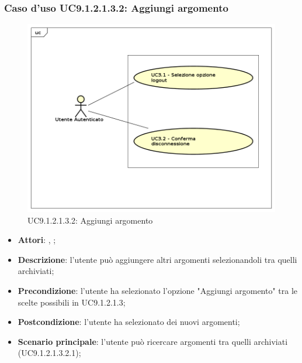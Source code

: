 						\subsubsection{Caso d'uso UC9.1.2.1.3.2: Aggiungi argomento}
						\label{UC9.1.2.1.3.2}
						\begin{figure}[h]
							\centering
							\includegraphics[scale=0.7,keepaspectratio]{UML/UC9.png}
							\caption{UC9.1.2.1.3.2: Aggiungi argomento}
						\end{figure}
						\FloatBarrier
						\begin{itemize}
							\item \textbf{Attori}: \uau, \uaupro;
							\item \textbf{Descrizione}: l'utente può aggiungere altri argomenti selezionandoli tra quelli archiviati;  
							\item \textbf{Precondizione}: l'utente ha selezionato l'opzione "Aggiungi argomento" tra le scelte possibili in UC9.1.2.1.3;
							\item \textbf{Postcondizione}: l'utente ha selezionato dei nuovi argomenti;
							\item \textbf{Scenario principale}: l'utente può ricercare argomenti tra quelli archiviati (UC9.1.2.1.3.2.1);
						\end{itemize}
						
